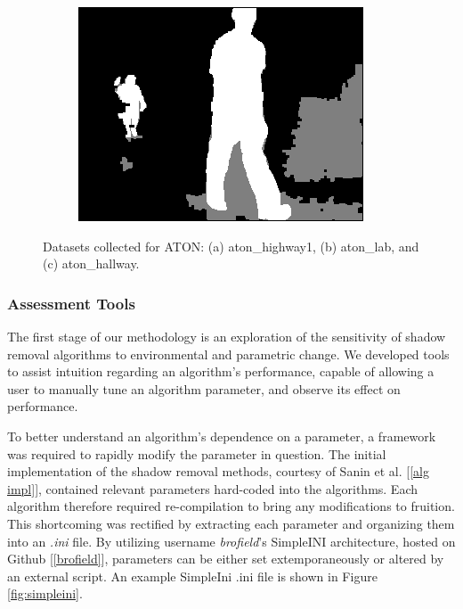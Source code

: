 \begin{figure}
\begin{subfigure}{.3\linewidth}
  \caption{}
\end{subfigure}
\hfill
\begin{subfigure}{.3\linewidth}
  \includegraphics[width=1\linewidth]{figures/hallway_gt_0164.jpg}
  \caption{}
\end{subfigure}

\caption{Datasets collected for ATON: (a) aton\_highway1, (b) aton\_lab, and (c) aton\_hallway.}
\label{fig:datasetsgt}
\end{figure}

\FloatBarrier
\subsubsection{Assessment Tools}

The first stage of our methodology is an exploration of the sensitivity of shadow removal algorithms to environmental and parametric change. We developed tools to assist intuition regarding an algorithm's performance, capable of allowing a user to manually tune an algorithm parameter, and observe its effect on performance.

To better understand an algorithm's dependence on a parameter, a framework was required to rapidly modify the parameter in question. The initial implementation of the shadow removal methods, courtesy of Sanin et al. [\ref{alg impl}], contained relevant parameters hard-coded into the algorithms. Each algorithm therefore required re-compilation to bring any modifications to fruition. This shortcoming was rectified by extracting each parameter and organizing them into an \textit{.ini} file. By utilizing username \textit{brofield}'s SimpleINI architecture, hosted on Github [\ref{brofield}], parameters can be either set extemporaneously or altered by an external script. An example SimpleIni .ini file is shown in Figure \ref{fig:simpleini}.


